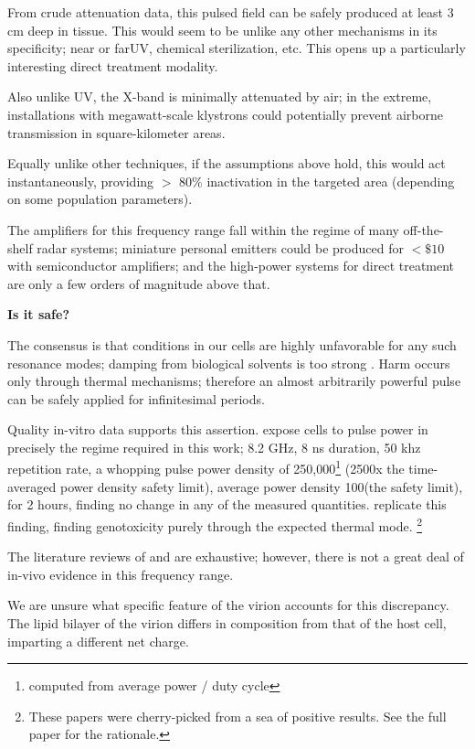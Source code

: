 \documentclass[fleqn,10pt]{paper}
\begin{document}
From crude attenuation data, this pulsed field can be safely produced at least 3 cm deep in tissue. This would seem to be unlike any other mechanisms in its specificity; near or far\cite{Germicidal2017}UV, chemical sterilization, etc. This opens up a particularly interesting direct treatment modality.

Also unlike UV, the X-band is minimally attenuated by air; in the extreme, installations with megawatt-scale klystrons could potentially prevent airborne transmission in square-kilometer areas.

Equally unlike other techniques, if the assumptions above hold, this would act instantaneously, providing $>$ 80\% inactivation in the targeted area (depending on some population parameters).

The amplifiers for this frequency range fall within the regime of many off-the-shelf radar systems; miniature personal emitters could be produced for $ < \$10$ with semiconductor amplifiers; and the high-power systems for direct treatment are only a few orders of magnitude above that.

{\Large \textbf{Is it safe?}}

The consensus is that conditions in our cells are highly unfavorable for any such resonance modes; damping from biological solvents is too strong \cite{Vibrational2002}. Harm occurs only through thermal mechanisms; therefore an almost arbitrarily powerful pulse can be safely applied for infinitesimal periods.

Quality in-vitro data supports this assertion. \cite{Cytogenetic2006} expose cells to pulse power in precisely the regime required in this work; 8.2 GHz, 8 ns duration, 50 khz repetition rate, a whopping pulse power density of 250,000\Wsqm\footnote{computed from average power / duty cycle} (2500x the time-averaged power density safety limit), average power density 100\Wsqm (the safety limit), for 2 hours, finding no change in any of the measured quantities. \cite{DNA2004} replicate this finding, finding genotoxicity purely through the expected thermal mode. \footnote{These papers were cherry-picked from a sea of positive results. See the full paper for the rationale.}

The literature reviews of \cite{ICNIRP2020} and \cite{C95} are exhaustive; however, there is not a great deal of in-vivo evidence in this frequency range\cite{New2019}\cite{Comprehensive2018}.

We are unsure what specific feature of the virion accounts for this discrepancy. The lipid bilayer of the virion differs in composition from that of the host cell, imparting a different net charge.
\end{document}
